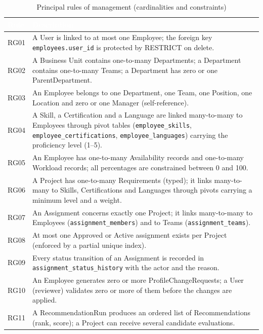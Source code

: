 \documentclass{bts-report}
\begin{document}
\begin{table}[H]
  \centering
  \caption{Principal rules of management (cardinalities and constraints)}
  \label{tab:regles}
  \begin{tabularx}{\textwidth}{|p{1.2cm}|X|}
    \hline
    \rowcolor{tableheader}
    \textcolor{white}{\textbf{Rule}} & \textcolor{white}{\textbf{Description}} \\
    \hline
    RG01 & A User is linked to at most one Employee; the foreign key \texttt{employees.user\_id} is protected by RESTRICT on delete. \\ \hline
    RG02 & A Business Unit contains one-to-many Departments; a Department contains one-to-many Teams; a Department has zero or one ParentDepartment. \\ \hline
    RG03 & An Employee belongs to one Department, one Team, one Position, one Location and zero or one Manager (self-reference). \\ \hline
    RG04 & A Skill, a Certification and a Language are linked many-to-many to Employees through pivot tables (\texttt{employee\_skills}, \texttt{employee\_certifications}, \texttt{employee\_languages}) carrying the proficiency level (1--5). \\ \hline
    RG05 & An Employee has one-to-many Availability records and one-to-many Workload records; all percentages are constrained between 0 and 100. \\ \hline
    RG06 & A Project has one-to-many Requirements (typed); it links many-to-many to Skills, Certifications and Languages through pivots carrying a minimum level and a weight. \\ \hline
    RG07 & An Assignment concerns exactly one Project; it links many-to-many to Employees (\texttt{assignment\_members}) and to Teams (\texttt{assignment\_teams}). \\ \hline
    RG08 & At most one Approved or Active assignment exists per Project (enforced by a partial unique index). \\ \hline
    RG09 & Every status transition of an Assignment is recorded in \texttt{assignment\_status\_history} with the actor and the reason. \\ \hline
    RG10 & An Employee generates zero or more ProfileChangeRequests; a User (reviewer) validates zero or more of them before the changes are applied. \\ \hline
    RG11 & A RecommendationRun produces an ordered list of Recommendations (rank, score); a Project can receive several candidate evaluations. \\ \hline
  \end{tabularx}
\end{table}
\end{document}
